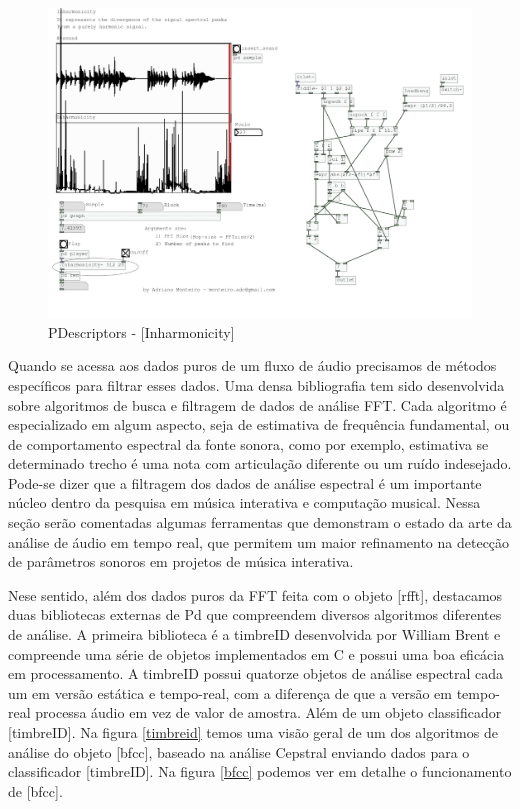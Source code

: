 \documentclass{ppgmus}
\begin{document}
\begin{figure}
\includegraphics[scale=.28]{pdescriptor}
\caption{PDescriptors - [Inharmonicity\texttildelow]}
\label{pdescriptor}
\end{figure} 


Quando se acessa aos dados puros de um fluxo de áudio precisamos de 
métodos específicos para filtrar esses dados. Uma densa bibliografia
tem sido desenvolvida sobre algoritmos de busca e filtragem de dados de
análise FFT. Cada algoritmo é especializado em algum aspecto, seja de
estimativa de frequência fundamental, ou de comportamento espectral da fonte sonora,
como por exemplo, estimativa se determinado trecho é uma nota com articulação diferente
ou um ruído indesejado.
Pode-se dizer que a filtragem dos dados de análise espectral é um importante
núcleo dentro da pesquisa em música interativa e computação musical. Nessa seção
serão comentadas algumas ferramentas que demonstram o estado da arte da análise de 
áudio em tempo real, que permitem um maior refinamento na detecção de parâmetros
sonoros em projetos de música interativa.

Nese sentido, além dos dados puros da FFT feita com o objeto [rfft\texttildelow],
destacamos duas bibliotecas externas de Pd que compreendem diversos algoritmos
diferentes de análise. A primeira biblioteca é a 
timbreID \cite{brentcepstral} desenvolvida por William Brent e compreende uma série de objetos
implementados em C e possui uma boa eficácia em processamento. A timbreID possui 
quatorze objetos de análise espectral cada um em versão estática e tempo-real, com a diferença
de que a versão em tempo-real processa áudio em vez de valor de amostra. Além
de um objeto classificador [timbreID]. Na figura \ref{timbreid} temos
uma visão geral de um dos algoritmos de análise do objeto  [bfcc\texttildelow], baseado na 
análise Cepstral enviando dados para o classificador [timbreID]. Na figura \ref{bfcc} podemos
ver em detalhe o funcionamento de [bfcc\texttildelow].
\end{document}
